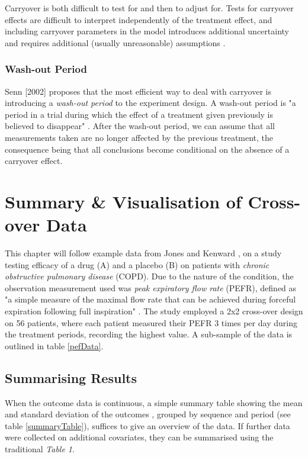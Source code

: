 \documentclass[12pt, TexShade, letterpaper]{report}
\begin{document}
Carryover is both difficult to test for and then to adjust for. Tests for carryover effects are difficult to interpret independently of the treatment effect, and including carryover parameters in the model introduces additional uncertainty and requires additional (usually unreasonable) assumptions \cite{senn2002crossover}.

\subsection{Wash-out Period}
Senn [2002] proposes that the most efficient way to deal with carryover is introducing a \textit{wash-out period} to the experiment design. A wash-out period is "a period in a trial during which the effect of a treatment given previously is believed to disappear" \cite{senn2002crossover}. After the wash-out period, we can assume that all measurements taken are no longer affected by the previous treatment, the consequence being that all conclusions become conditional on the absence of a carryover effect.

\chapter{Summary \& Visualisation of Cross-over Data} \label{visualisation}
This chapter will follow example data from Jones and Kenward \cite{jones2003design}, on a study testing efficacy of a drug (A) and a placebo (B) on patients with \textit{chronic obstructive pulmonary disease} (COPD). Due to the nature of the condition, the observation measurement used was \textit{peak expiratory flow rate} (PEFR), defined as "a simple measure of the maximal flow rate that can be achieved during forceful expiration following full inspiration" \cite{peakflowrate2023}. The study employed a 2x2 cross-over design on 56 patients, where each patient measured their PEFR 3 times per day during the treatment periods, recording the highest value. A sub-sample of the data is outlined in table \ref{pefData}.


\section{Summarising Results}
When the outcome data is continuous, a simple summary table showing the mean and standard deviation of the outcomes \cite{vetter2017descriptive}, grouped by sequence and period (see table \ref{summaryTable}), suffices to give an overview of the data.  If further data were collected on additional covariates, they can be summarised using the traditional \textit{Table 1}.

\end{document}

